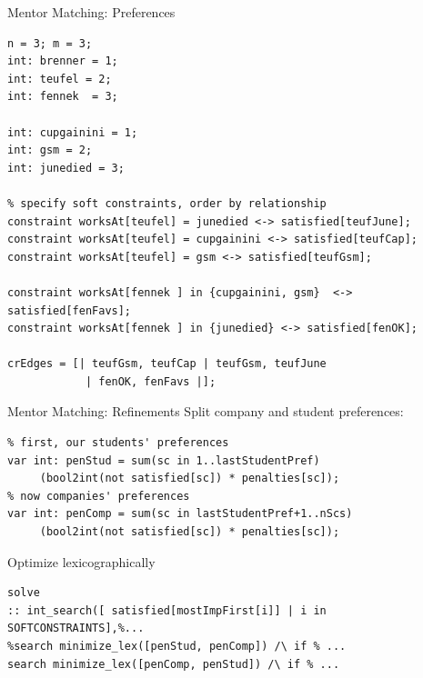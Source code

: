 \documentclass[10pt,xcolor={dvipsnames},fleqn]{beamer}
\begin{document}
\begin{frame}[fragile]{Mentor Matching: Preferences}
\begin{lstlisting}
n = 3; m = 3;
int: brenner = 1;
int: teufel = 2;
int: fennek  = 3;

int: cupgainini = 1;
int: gsm = 2;
int: junedied = 3;

% specify soft constraints, order by relationship
constraint worksAt[teufel] = junedied <-> satisfied[teufJune];
constraint worksAt[teufel] = cupgainini <-> satisfied[teufCap];
constraint worksAt[teufel] = gsm <-> satisfied[teufGsm];

constraint worksAt[fennek ] in {cupgainini, gsm}  <-> satisfied[fenFavs];
constraint worksAt[fennek ] in {junedied} <-> satisfied[fenOK];

crEdges = [| teufGsm, teufCap | teufGsm, teufJune 
            | fenOK, fenFavs |];
\end{lstlisting}
\end{frame}

\begin{frame}[fragile]{Mentor Matching: Refinements}
Split company and student preferences:
\begin{lstlisting}
% first, our students' preferences
var int: penStud = sum(sc in 1..lastStudentPref) 
     (bool2int(not satisfied[sc]) * penalties[sc]);
% now companies' preferences
var int: penComp = sum(sc in lastStudentPref+1..nScs)
     (bool2int(not satisfied[sc]) * penalties[sc]);
\end{lstlisting}

\vspace*{3ex}

Optimize lexicographically

\begin{lstlisting}
solve 
:: int_search([ satisfied[mostImpFirst[i]] | i in SOFTCONSTRAINTS],%... 
%search minimize_lex([penStud, penComp]) /\ if % ...
search minimize_lex([penComp, penStud]) /\ if % ...
\end{lstlisting}
\end{frame}
\end{document}
